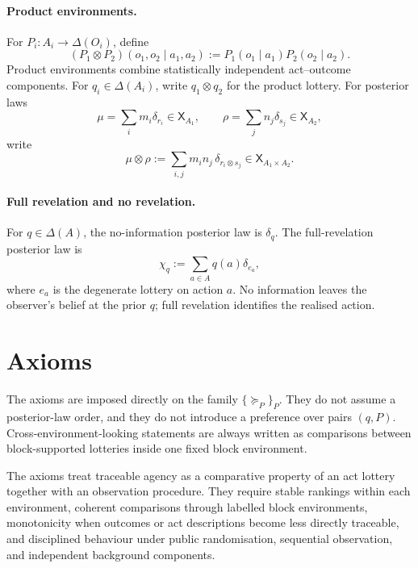 \documentclass[11pt,a4paper]{article}
\theoremstyle{definition}
\newcommand{\1}{\mathbf 1}
\begin{document}
\paragraph{Product environments.}
For $P_i:A_i\to\Delta(O_i)$, define
\[
(P_1\otimes P_2)(o_1,o_2\mid a_1,a_2)
:=
P_1(o_1\mid a_1)P_2(o_2\mid a_2).
\]
Product environments combine statistically independent act--outcome components.
For $q_i\in\Delta(A_i)$, write $q_1\otimes q_2$ for the product lottery.
For posterior laws
\[
\mu=\sum_i m_i\delta_{r_i}\in\mathsf X_{A_1},
\qquad
\rho=\sum_j n_j\delta_{s_j}\in\mathsf X_{A_2},
\]
write
\[
\mu\otimes\rho
:=
\sum_{i,j}m_i n_j\,\delta_{r_i\otimes s_j}
\in\mathsf X_{A_1\times A_2}.
\]

\paragraph{Full revelation and no revelation.}
For $q\in\Delta(A)$, the no-information posterior law is $\delta_q$.  The full-revelation posterior law is
\[
\chi_q:=\sum_{a\in A}q(a)\delta_{e_a},
\]
where $e_a$ is the degenerate lottery on action $a$.
No information leaves the observer's belief at the prior $q$; full revelation identifies the realised action.

\section*{Axioms}

The axioms are imposed directly on the family $\{\succeq_P\}_P$.  They do not assume a posterior-law order, and they do
not introduce a preference over pairs $(q,P)$.  Cross-environment-looking statements are always written as comparisons
between block-supported lotteries inside one fixed block environment.

The axioms treat traceable agency as a comparative property of an act lottery together with an observation procedure.  They
require stable rankings within each environment, coherent comparisons through labelled block environments, monotonicity
when outcomes or act descriptions become less directly traceable, and disciplined behaviour under public randomisation,
sequential observation, and independent background components.
\end{document}
